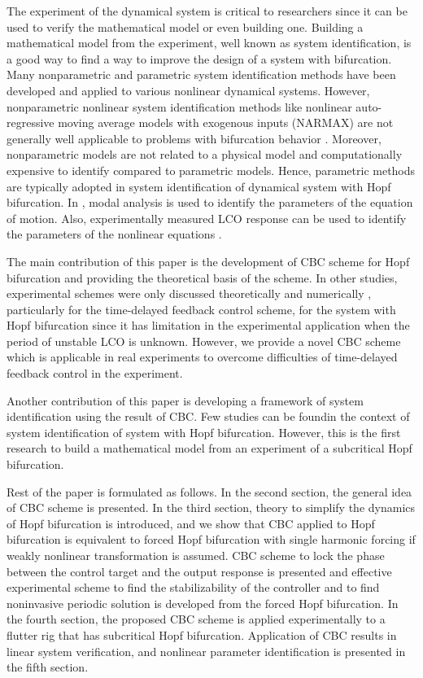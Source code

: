 \documentclass[openacc]{rsproca_new}%
\begin{document}
The experiment of the dynamical system is critical to researchers since it can be used to verify the mathematical model or even building one. Building a mathematical model from the experiment, well known as system identification, is a good way to find a way to improve the design of a system with bifurcation. Many nonparametric and parametric system identification methods have been developed and applied to various nonlinear dynamical systems. However, nonparametric nonlinear system identification methods like nonlinear auto-regressive moving average models with exogenous inputs (NARMAX) are not generally well applicable to problems with bifurcation behavior \cite{thothadri2005nonlinear}. Moreover, nonparametric models are not related to a physical model and computationally expensive to identify compared to parametric models. Hence, parametric methods are typically adopted in system identification of dynamical system with Hopf bifurcation. In \cite{fichera2014experimental}, modal analysis is used to identify the parameters of the equation of motion. Also, experimentally measured LCO response can be used to identify the parameters of the nonlinear equations \cite{abdelkefi2013analytical}.

The main contribution of this paper is the development of CBC scheme for Hopf bifurcation and providing the theoretical basis of the scheme. In other studies, experimental schemes were only discussed theoretically and numerically \cite{brown2011time,postlethwaite2013feedback}, particularly for the time-delayed feedback control scheme, for the system with Hopf bifurcation since it has limitation in the experimental application when the period of unstable LCO is unknown. However, we provide a novel CBC scheme which is applicable in real experiments to overcome difficulties of time-delayed feedback control in the experiment.

Another contribution of this paper is developing a framework of system identification using the result of CBC. Few studies \cite{abdelkefi2013analytical,thothadri2005nonlinear} can be foundin the context of system identification of system with Hopf bifurcation. However, this is the first research to build a mathematical model from an experiment of a subcritical Hopf bifurcation.

Rest of the paper is formulated as follows. In the second section, the general idea of CBC scheme is presented. In the third section, theory to simplify the dynamics of Hopf bifurcation is introduced, and we show that CBC applied to Hopf bifurcation is equivalent to forced Hopf bifurcation with single harmonic forcing if weakly nonlinear transformation is assumed. CBC scheme to lock the phase between the control target and the output response is presented and effective experimental scheme to find the stabilizability of the controller and to find noninvasive periodic solution is developed from the forced Hopf bifurcation. In the fourth section, the proposed CBC scheme is applied experimentally to a flutter rig that has subcritical Hopf bifurcation. Application of CBC results in linear system verification, and nonlinear parameter identification is presented in the fifth section.
\end{document}
